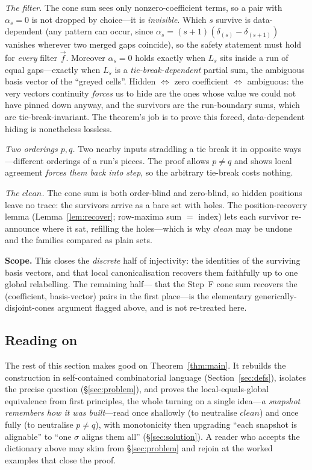 \emph{The filter.}  The cone sum sees only nonzero-coefficient terms, so a pair
with $\alpha_s=0$ is not dropped by choice---it is \emph{invisible}.  Which $s$
survive is data-dependent (any pattern can occur, since
$\alpha_s=(s{+}1)(\delta_{(s)}-\delta_{(s+1)})$ vanishes wherever two merged
gaps coincide), so the safety statement must hold for \emph{every} filter
$\vec f$.  Moreover $\alpha_s=0$ holds exactly when $L_s$ sits inside a run of
equal gaps---exactly when $L_s$ is a \emph{tie-break-dependent} partial sum, the
ambiguous basis vector of the ``greyed cells''.  Hidden $\iff$ zero coefficient
$\iff$ ambiguous: the very vectors continuity \emph{forces} us to hide are the
ones whose value we could not have pinned down anyway, and the survivors are the
run-boundary sums, which are tie-break-invariant.  The theorem's job is to
prove this forced, data-dependent hiding is nonetheless lossless.

\emph{Two orderings $p,q$.}  Two nearby inputs straddling a tie break it in
opposite ways---different orderings of a run's pieces.  The proof allows
$p\neq q$ and shows local agreement \emph{forces them back into step}, so the
arbitrary tie-break costs nothing.

\emph{The $clean$.}  The cone sum is both order-blind and zero-blind, so hidden
positions leave no trace: the survivors arrive as a bare set with holes.  The
position-recovery lemma (Lemma~\ref{lem:recover}; row-maxima sum $=$ index)
lets each survivor re-announce where it sat, refilling the holes---which is why
$clean$ may be undone and the families compared as plain sets.

\begin{tcolorbox}[notebox]
\textbf{Scope.}  This closes the \emph{discrete} half of injectivity: the
identities of the surviving basis vectors, and that local canonicalisation
recovers them faithfully up to one global relabelling.  The remaining half---
that the Step~F cone sum recovers the (coefficient, basis-vector) pairs in the
first place---is the elementary generically-disjoint-cones argument flagged
above, and is not re-treated here.
\end{tcolorbox}

\subsection*{Reading on}

The rest of this section makes good on Theorem~\ref{thm:main}.  It
rebuilds the construction in self-contained combinatorial language
(Section~\ref{sec:defs}), isolates the precise question
(\S\ref{sec:problem}), and proves the local-equals-global equivalence from
first principles, the whole turning on a single idea---\emph{a snapshot
remembers how it was built}---read once shallowly (to neutralise $clean$) and
once fully (to neutralise $p\neq q$), with monotonicity then upgrading
``each snapshot is alignable'' to ``one $\sigma$ aligns them all''
(\S\ref{sec:solution}).  A reader who accepts the dictionary above may skim from
\S\ref{sec:problem} and rejoin at the worked examples that close the proof.
